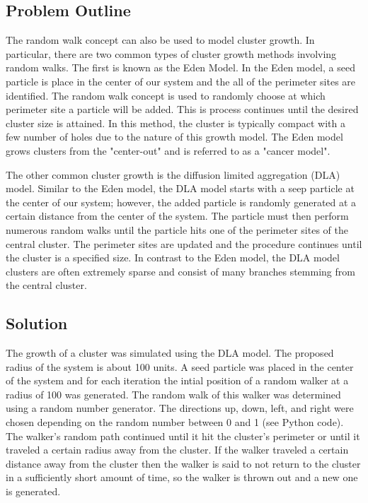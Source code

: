 \documentclass[a4paper,12pt]{article}
\begin{document}
\subsection{Problem Outline}
\indent
\indent The random walk concept can also be used to model cluster growth.  In particular, there are two common types of cluster growth methods involving random walks.
The first is known as the Eden Model.  In the Eden model, a seed particle is place in the center of our system and the all of the perimeter sites are identified.  The 
random walk concept is used to randomly choose at which perimeter site a particle will be added.  This is process continues until the desired cluster size is attained.
In this method, the cluster is typically compact with a few number of holes due to the nature of this growth model.  The Eden model grows clusters from the "center-out" 
and is referred to as a "cancer model". 

\indent The other common cluster growth is the diffusion limited aggregation (DLA) model.  Similar to the Eden model, the DLA model starts with a seep particle at 
the center of our system; however, the added particle is randomly generated at a certain distance from the center of the system.  The particle must then perform 
numerous random walks until the particle hits one of the perimeter sites of the central cluster.  The perimeter sites are updated and the procedure continues until
the cluster is a specified size.  In contrast to the Eden model, the DLA model clusters are often extremely sparse and consist of many branches stemming from the 
central cluster.

\subsection{Solution}
\indent
\indent The growth of a cluster was simulated using the DLA model.  The proposed radius of the system is about 100 units.  A seed particle was placed in the center of 
the system and for each iteration the intial position of a random walker at a radius of 100 was generated.  The random walk of this walker was determined using a 
random number generator.  The directions up, down, left, and right were chosen depending on the random number between 0 and 1 (see Python code). The walker's random path
continued until it hit the cluster's perimeter or until it traveled a certain radius away from the cluster.  If the walker traveled a certain distance away from the 
cluster then the walker is said to not return to the cluster in a sufficiently short amount of time, so the walker is thrown out and a new one is generated.
\end{document}
